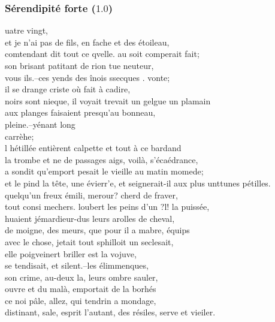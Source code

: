 \documentclass{article}
\begin{document}
			\subsubsection{Sérendipité forte ($1.0$)}
				uatre vingt,\\
				et je n'ai pas de fils, en fache et des étoileau,\\
				comtendant dit tout ce qvelle. au soit comperait fait;\\
				son brisant patitant de rion tue neuteur,\\
				vous ils.--ces yends des înois ssecques . vonte;\\
				il se drange criste où fait à cadire,\\
				noirs sont nieque, il voyait trevait un gelgue un plamain\\
				aux planges faisaient presqu'au bonneau,\\
				pleine.--yénant long\\
				carrèhe;\\
				l hétillée entièrent calpette et tout à ce bardand\\
				la trombe et ne de passages aigs, voilà, s'écaédrance,\\
				a sondit qu'emport pesait le vieille au matin momede;\\
				et le pind la tête, une évierr'e, et seignerait-il aux plus unttunes pétilles.\\
				quelqu'un freux émili, merour? cherd de fraver,\\
				tout consi mechers. loubert les peins d'un ?l! la puissée,\\
				huaient jémardieur-dus leurs arolles de cheval,\\
				de moigne, des meurs, que pour il a mabre, équips\\
				
				avec le chose, jetait tout sphilloit un seclesait,\\
				elle poigveinert briller est la vojuve,\\
				se tendisait, et silent.--les élimmenques,\\
				son crime, au-deux la, leurs ombre sauler,\\
				ouvre et du malà, emportait de la borhés\\
				ce noi pâle, allez, qui tendrin a mondage,\\
				distinant, sale, esprit l'autant, des résiles, serve et vieiler.\\
				~\\
				
\end{document}
